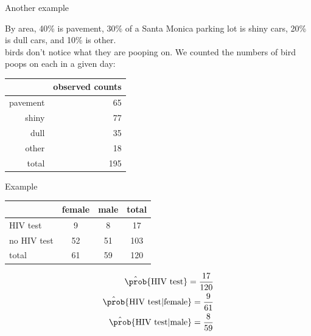 \begin{frame}{Another example}

    By area, 
    40\% is pavement,
    30\% of a Santa Monica parking lot is shiny cars,
    20\% is dull cars,
    and 10\% is other.\\
     birds don't notice what they are pooping on.
    We counted the numbers of bird poops on each in a given day:
    \begin{center}
        \begin{tabular}{rr}
            & observed counts \\
            \hline 
            pavement & 65 \\
            shiny & 77 \\
            dull & 35 \\
            other & 18 \\
            \hline
            total & 195
        \end{tabular}
    \end{center}

\end{frame}


\begin{frame}{Example}


    \begin{center}
        \begin{tabular}{lcc|c}
            & female & male & total \\
            \hline
            HIV test & 9 & 8 & 17 \\
            no HIV test & 52 & 51 & 103 \\
            \hline
            total & 61 & 59 & 120 \\
        \end{tabular}
    \end{center}

    \vspace{1em}

    \begin{align*}
        \hat \prob\{ \text{HIV test} \} = \frac{17}{120} \\
        \hat \prob\{ \text{HIV test} \vert \text{female} \} = \frac{9}{61} \\
        \hat \prob\{ \text{HIV test} \vert \text{male} \} = \frac{8}{59} \\
    \end{align*}

\end{frame}

